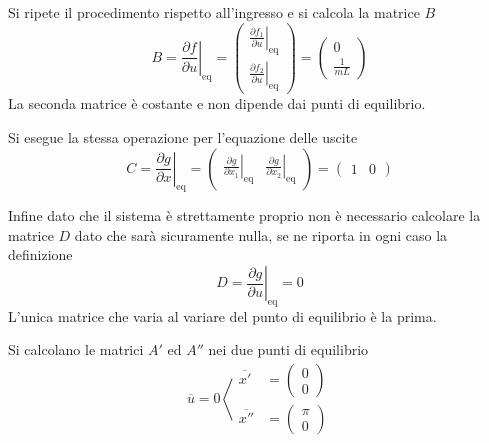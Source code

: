 Si ripete il procedimento rispetto all'ingresso e si calcola la matrice $B$
$$
B = \left.\frac{\partial f }{\partial u}\right|_{\text{eq}} =
\begin{pmatrix}
 \left.\frac{\partial f_1}{\partial u}\right|_{\text{eq}} \\
 \left.\frac{\partial f_2}{\partial u}\right|_{\text{eq}}
\end{pmatrix} =
\begin{pmatrix}
0 \\
\frac{1}{mL}
\end{pmatrix}
$$
La seconda matrice è costante e non dipende dai punti di equilibrio.

Si esegue la stessa operazione per l'equazione delle uscite
$$
C = \left.\frac{\partial g}{\partial x}\right|_{\text{eq}} =
\begin{pmatrix}
 \left.\frac{\partial g}{\partial x_1}\right|_{\text{eq}}  &
 \left.\frac{\partial g}{\partial x_2}\right|_{\text{eq}}
\end{pmatrix} =
\begin{pmatrix}
 1 & 0
\end{pmatrix}
$$

Infine dato che il sistema è strettamente proprio non è necessario calcolare la
matrice $D$ dato che sarà sicuramente nulla, se ne riporta in ogni caso la
definizione
$$
D = \left.\frac{\partial g}{\partial u}\right|_{\text{eq}} =
0
$$
L'unica matrice che varia al variare del punto di equilibrio è la prima.

Si calcolano le matrici $A'$ ed $A''$ nei due punti di equilibrio
$$
\overline{u} = 0 \left\langle
\begin{aligned}
 \overline{x'} &= \begin{pmatrix}
                  0 \\ 0
                 \end{pmatrix} \\
 \overline{x''} &= \begin{pmatrix}
                   \pi \\ 0
                  \end{pmatrix}
\end{aligned} \right.
$$
